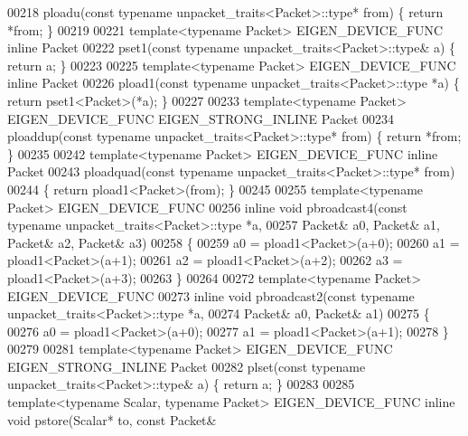 \begin{DoxyCode}
00218 ploadu(\textcolor{keyword}{const} \textcolor{keyword}{typename} unpacket\_traits<Packet>::type* from) \{ \textcolor{keywordflow}{return} *from; \}
00219 
00221 \textcolor{keyword}{template}<\textcolor{keyword}{typename} Packet> EIGEN\_DEVICE\_FUNC \textcolor{keyword}{inline} Packet
00222 pset1(\textcolor{keyword}{const} \textcolor{keyword}{typename} unpacket\_traits<Packet>::type& a) \{ \textcolor{keywordflow}{return} a; \}
00223 
00225 \textcolor{keyword}{template}<\textcolor{keyword}{typename} Packet> EIGEN\_DEVICE\_FUNC \textcolor{keyword}{inline} Packet
00226 pload1(\textcolor{keyword}{const} \textcolor{keyword}{typename} unpacket\_traits<Packet>::type  *a) \{ \textcolor{keywordflow}{return} pset1<Packet>(*a); \}
00227 
00233 \textcolor{keyword}{template}<\textcolor{keyword}{typename} Packet> EIGEN\_DEVICE\_FUNC EIGEN\_STRONG\_INLINE Packet
00234 ploaddup(\textcolor{keyword}{const} \textcolor{keyword}{typename} unpacket\_traits<Packet>::type* from) \{ \textcolor{keywordflow}{return} *from; \}
00235 
00242 \textcolor{keyword}{template}<\textcolor{keyword}{typename} Packet> EIGEN\_DEVICE\_FUNC \textcolor{keyword}{inline} Packet
00243 ploadquad(\textcolor{keyword}{const} \textcolor{keyword}{typename} unpacket\_traits<Packet>::type* from)
00244 \{ \textcolor{keywordflow}{return} pload1<Packet>(from); \}
00245 
00255 \textcolor{keyword}{template}<\textcolor{keyword}{typename} Packet> EIGEN\_DEVICE\_FUNC
00256 \textcolor{keyword}{inline} \textcolor{keywordtype}{void} pbroadcast4(\textcolor{keyword}{const} \textcolor{keyword}{typename} unpacket\_traits<Packet>::type *a,
00257                         Packet& a0, Packet& a1, Packet& a2, Packet& a3)
00258 \{
00259   a0 = pload1<Packet>(a+0);
00260   a1 = pload1<Packet>(a+1);
00261   a2 = pload1<Packet>(a+2);
00262   a3 = pload1<Packet>(a+3);
00263 \}
00264 
00272 \textcolor{keyword}{template}<\textcolor{keyword}{typename} Packet> EIGEN\_DEVICE\_FUNC
00273 \textcolor{keyword}{inline} \textcolor{keywordtype}{void} pbroadcast2(\textcolor{keyword}{const} \textcolor{keyword}{typename} unpacket\_traits<Packet>::type *a,
00274                         Packet& a0, Packet& a1)
00275 \{
00276   a0 = pload1<Packet>(a+0);
00277   a1 = pload1<Packet>(a+1);
00278 \}
00279 
00281 \textcolor{keyword}{template}<\textcolor{keyword}{typename} Packet> EIGEN\_DEVICE\_FUNC EIGEN\_STRONG\_INLINE Packet
00282 plset(\textcolor{keyword}{const} \textcolor{keyword}{typename} unpacket\_traits<Packet>::type& a) \{ \textcolor{keywordflow}{return} a; \}
00283 
00285 \textcolor{keyword}{template}<\textcolor{keyword}{typename} Scalar, \textcolor{keyword}{typename} Packet> EIGEN\_DEVICE\_FUNC \textcolor{keyword}{inline} \textcolor{keywordtype}{void} pstore(Scalar* to, \textcolor{keyword}{const} Packet& 

\end{DoxyCode}
